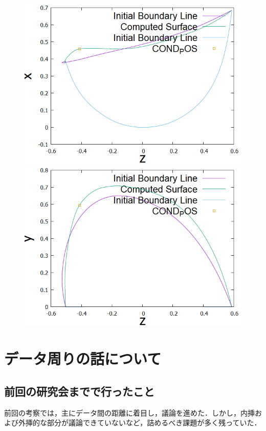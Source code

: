 \documentclass[16.7pt]{jsarticle}
\begin{document}
	\begin{figure}[h]
		\centering
		\begin{minipage}{0.45\hsize}
			\centering
			\includegraphics[scale = 0.3]{./figure/02Plus/ObtainedRidgeLinefromz-x.png}
		\end{minipage}
		\begin{minipage}{0.45\hsize}
			\centering
			\includegraphics[scale = 0.3]{./figure/02Plus/ObtainedRidgeLinefromz-y.png}
		\end{minipage}
	\end{figure}
\section{データ周りの話について}
		\subsection{前回の研究会までで行ったこと}
		前回の考察では，主にデータ間の距離に着目し，議論を進めた．しかし，内挿および外挿的な部分が議論できていないなど，詰めるべき課題が多く残っていた．
		
\end{document}

